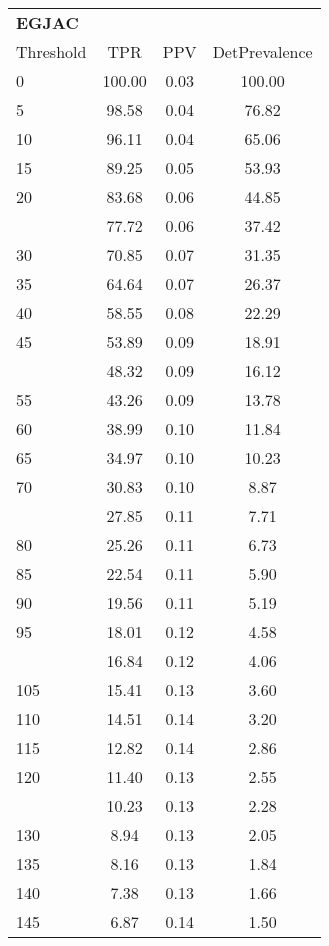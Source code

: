 \begin{table}[ht]
\centering
\tiny
\begin{tabular}{lccc}
  \toprule
  \multicolumn{4}{l}{\textbf{EGJAC}} \\\addlinespace
Threshold & TPR & PPV & DetPrevalence \\ 
  \midrule
0 & 100.00 & 0.03 & 100.00 \\ 
  5 & 98.58 & 0.04 & 76.82 \\ 
  10 & 96.11 & 0.04 & 65.06 \\ 
  15 & 89.25 & 0.05 & 53.93 \\ 
  20 & 83.68 & 0.06 & 44.85 \\ 
   \addlinespace
25 & 77.72 & 0.06 & 37.42 \\ 
  30 & 70.85 & 0.07 & 31.35 \\ 
  35 & 64.64 & 0.07 & 26.37 \\ 
  40 & 58.55 & 0.08 & 22.29 \\ 
  45 & 53.89 & 0.09 & 18.91 \\ 
   \addlinespace
50 & 48.32 & 0.09 & 16.12 \\ 
  55 & 43.26 & 0.09 & 13.78 \\ 
  60 & 38.99 & 0.10 & 11.84 \\ 
  65 & 34.97 & 0.10 & 10.23 \\ 
  70 & 30.83 & 0.10 & 8.87 \\ 
   \addlinespace
75 & 27.85 & 0.11 & 7.71 \\ 
  80 & 25.26 & 0.11 & 6.73 \\ 
  85 & 22.54 & 0.11 & 5.90 \\ 
  90 & 19.56 & 0.11 & 5.19 \\ 
  95 & 18.01 & 0.12 & 4.58 \\ 
   \addlinespace
100 & 16.84 & 0.12 & 4.06 \\ 
  105 & 15.41 & 0.13 & 3.60 \\ 
  110 & 14.51 & 0.14 & 3.20 \\ 
  115 & 12.82 & 0.14 & 2.86 \\ 
  120 & 11.40 & 0.13 & 2.55 \\ 
   \addlinespace
125 & 10.23 & 0.13 & 2.28 \\ 
  130 & 8.94 & 0.13 & 2.05 \\ 
  135 & 8.16 & 0.13 & 1.84 \\ 
  140 & 7.38 & 0.13 & 1.66 \\ 
  145 & 6.87 & 0.14 & 1.50 \\ 

\end{tabular}
\end{table}
